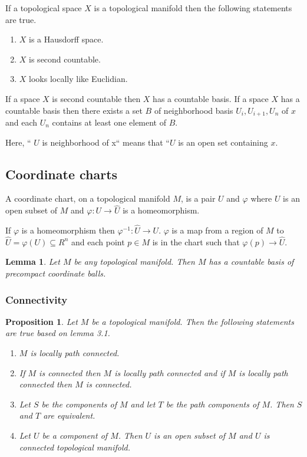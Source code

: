 \documentclass{article}
\newtheorem{proposition}[theorem]{Proposition}
\newtheorem{lemma}[theorem]{Lemma}
\begin{document}
If a topological space $ X $ is a topological manifold then the following statements are true.

\begin{enumerate}
\item $ X $ is a Hausdorff space.
\item $ X $ is second countable.
\item $ X $ looks locally like Euclidian.
\end{enumerate}

If a space $ X $ is second countable then $ X $ has a countable basis. If a space $ X $ has a countable basis then there exists a set $ B $ of neighborhood basis $ U_{i}, U_{i+1}, U_{n} $ of $ x $ and each $ U_{n} $ contains at least one element of $ B $.

Here, `` $ U $ is neighborhood of x`` means that ``$ U $ is an open set containing $ x $.

\subsection{Coordinate charts}
A coordinate chart, on a topological manifold $ M $, is a pair $ U $ and $ \varphi $ where $ U $ is an open subset of $ M $ and $ \varphi: U \rightarrow \hat{U} $ is a homeomorphism.

If $ \varphi $ is a homeomorphism then $  \varphi^{-1}: \hat{U} \rightarrow U $. $ \varphi $ is a map from a region of $ M $ to  $ \hat{U} = \varphi(U) \subseteq R^n $ and each point $ p \in M $ is in the chart such that $ \varphi(p) \rightarrow \hat{U} $.

\begin{lemma}
Let $ M $ be any topological manifold. Then $ M $ has a countable basis of precompact coordinate balls.
\end{lemma}

\subsubsection{Connectivity}
\begin{proposition}
  Let $ M $ be a topological manifold.  Then the following statements are true based on lemma 3.1.
  \begin{enumerate}
  \item $ M $ is locally path connected.
  \item If $ M $ is connected then $ M $ is locally path connected and if $ M $ is locally path connected then $ M $ is connected.
  \item Let $ S $ be the components of $ M $ and let $ T $ be the path components of $ M $. Then $ S $ and $ T $ are equivalent.
  \item Let $ U $ be a component of $ M $. Then $ U $ is an open subset of $ M $ and $ U $ is connected topological manifold.
  \end{enumerate}
\end{proposition}
\end{document}
